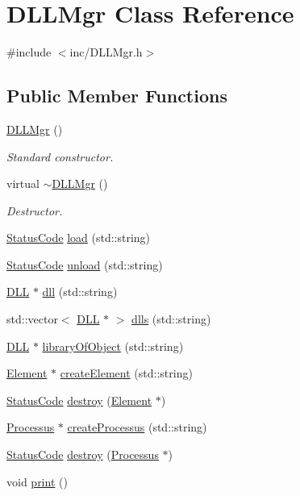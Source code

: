 \hypertarget{classDLLMgr}{}\section{D\+L\+L\+Mgr Class Reference}
\label{classDLLMgr}


{\ttfamily \#include $<$inc/\+D\+L\+L\+Mgr.\+h$>$}

\subsection*{Public Member Functions}
\begin{DoxyCompactItemize}
\item 
\hyperlink{classDLLMgr_a3751927270f2acc954d9171e1f109876}{D\+L\+L\+Mgr} ()
\begin{DoxyCompactList}\small\item\em Standard constructor. \end{DoxyCompactList}\item 
virtual \hyperlink{classDLLMgr_a80e79a573af874023318064ad9d32e74}{$\sim$\+D\+L\+L\+Mgr} ()
\begin{DoxyCompactList}\small\item\em Destructor. \end{DoxyCompactList}\item 
\hyperlink{classStatusCode}{Status\+Code} \hyperlink{classDLLMgr_a3c92bec62ace09dd00959c31bb2475d6}{load} (std\+::string)
\item 
\hyperlink{classStatusCode}{Status\+Code} \hyperlink{classDLLMgr_a0e4b881509f638f94cb4d6612578157b}{unload} (std\+::string)
\item 
\hyperlink{classDLL}{D\+LL} $\ast$ \hyperlink{classDLLMgr_a0241372eb2e136f61e609a04426636bd}{dll} (std\+::string)
\item 
std\+::vector$<$ \hyperlink{classDLL}{D\+LL} $\ast$ $>$ \hyperlink{classDLLMgr_a40a2b326bd4f01e58b4afa78a3773898}{dlls} (std\+::string)
\item 
\hyperlink{classDLL}{D\+LL} $\ast$ \hyperlink{classDLLMgr_a7e8c992899b7357158aef047a2f15c51}{library\+Of\+Object} (std\+::string)
\item 
\hyperlink{classElement}{Element} $\ast$ \hyperlink{classDLLMgr_a8cc61eaf98a6aa3cb99fee7226477053}{create\+Element} (std\+::string)
\item 
\hyperlink{classStatusCode}{Status\+Code} \hyperlink{classDLLMgr_abc9c97bab16c8f261626ed401d67c8c8}{destroy} (\hyperlink{classElement}{Element} $\ast$)
\item 
\hyperlink{classProcessus}{Processus} $\ast$ \hyperlink{classDLLMgr_a04161fedb24bb6ae8469848d97804c39}{create\+Processus} (std\+::string)
\item 
\hyperlink{classStatusCode}{Status\+Code} \hyperlink{classDLLMgr_a8f0923cc39c9f73d272f38bcbcf7ca18}{destroy} (\hyperlink{classProcessus}{Processus} $\ast$)
\item 
void \hyperlink{classDLLMgr_a223c039ca2d098fd825d52b22a9feeb4}{print} ()
\end{DoxyCompactItemize}
